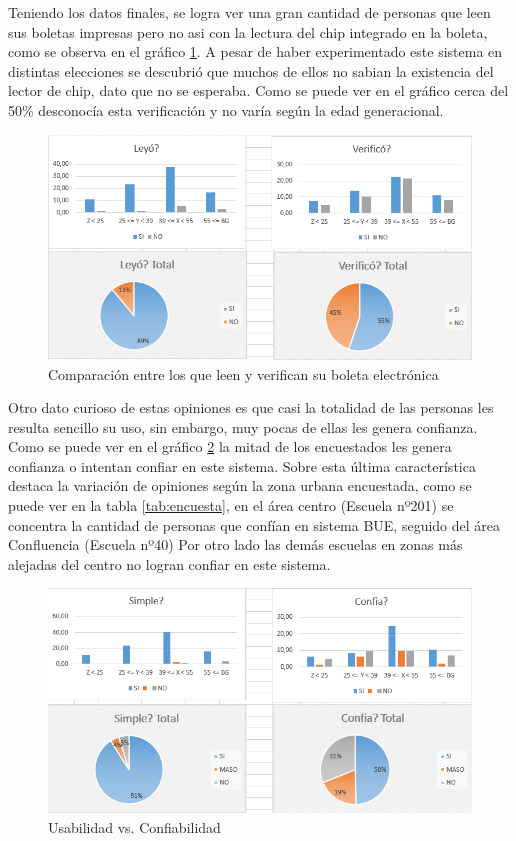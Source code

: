 Teniendo los datos finales, se logra ver una gran cantidad de personas que leen sus boletas impresas pero no asi con la lectura del chip integrado en la boleta, como se observa en el gráfico \ref{graf:votantes}. A pesar de haber experimentado este sistema en distintas elecciones se descubrió que muchos de ellos no sabian la existencia del lector de chip, dato que no se esperaba. Como se puede ver en el gráfico cerca del 50\% desconocía esta verificación y no varía según la edad generacional.

\begin{figure}[h!]
  \includegraphics[width=\textwidth]{img/yfrjnCosp0.png}
  \caption{Comparación entre los que leen y verifican su boleta electrónica}
  \label{graf:votantes}
\end{figure}

Otro dato curioso de estas opiniones es que casi la totalidad de las personas les resulta sencillo su uso, sin embargo, muy pocas de ellas les genera confianza. Como se puede ver en el gráfico \ref{graf:votantesUsoConfia} la mitad de los encuestados les genera confianza o intentan confiar en este sistema. Sobre esta última característica destaca la variación de opiniones según la zona urbana encuestada, como se puede ver en la tabla \ref{tab:encuesta}, en el área centro (Escuela nº201)  se concentra la cantidad de personas que confían en sistema BUE, seguido del área Confluencia (Escuela nº40)  %
Por otro lado las demás escuelas en zonas más alejadas del centro no logran confiar en este sistema. 
\begin{figure}[h!]
  \includegraphics[width=\textwidth]{img/SLLXOorTia.png}
  \caption{Usabilidad vs. Confiabilidad}
  \label{graf:votantesUsoConfia}
\end{figure}

